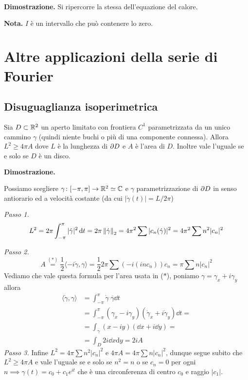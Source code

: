 \textbf{Dimostrazione.}
Si ripercorre la stessa dell'equazione del calore.

\textbf{Nota.} $I$ è un intervallo che può contenere lo zero.


\section{Altre applicazioni della serie di Fourier}

\subsection{Disuguaglianza isoperimetrica}

Sia $D \subset \mathbb R^2$ un aperto limitato con frontiera $C^1$ parametrizzata da un unico cammino $\gamma$ (quindi niente buchi o più di una componente connessa). Allora $L^2 \geq 4 \pi A$ dove $L$ è la lunghezza di $\partial D$ e $A$ è l'area di $D$. Inoltre vale l'uguale se e solo se $D$ è un disco.

\textbf{Dimostrazione.}

Possiamo scegliere $\gamma \colon [-\pi, \pi] \to \mathbb R^2 \simeq \mathbb C$ e $\gamma$ parametrizzazione di $\partial D$ in senso antiorario ed a velocità costante (da cui $|\dot\gamma(t)| = L / 2\pi$)

\textit{Passo 1.}
$$
L^2 = 2\pi \int_{-\pi}^\pi |\dot \gamma|^2 \,\mathrm{d} t = 2\pi \left\lVert \dot \gamma \right\rVert_2 = 4 \pi^2 \sum |c_n(\dot \gamma)|^2 = 4 \pi^2 \sum n^2 |c_n|^2
$$

\textit{Passo 2.}
$$
A \overset{(*)}{=} \frac{1}{2}\langle -i\dot\gamma, \gamma \rangle = \frac{1}{2} 2\pi \sum (-i (inc_n))c_n = \pi \sum n |c_n|^2
$$
Vediamo che vale questa formula per l'area usata in ($*$), poniamo $\gamma = \gamma_x + i \gamma_y$ allora
$$
\begin{aligned}
	\langle \dot\gamma, \gamma \rangle 
	&= \int_{-\pi}^\pi \dot\gamma \; \overline\gamma \dd t \\
	&= \int_{-\pi}^\pi (\gamma_x - i \gamma_y) (\dot\gamma_x + i \dot\gamma_y) \dd t = \\
	&= \int_\gamma (x - iy) (\dd x + i \dd y) = \\
	&= \int_D 2i \dd x \mathrm d y = 2i A
\end{aligned}
$$
\textit{Passo 3.}
Infine $L^2 = 4 \pi \sum n^2 |c_n|^2$ e $4\pi A = 4\pi \sum n |c_n|^2$, dunque segue subito che $L^2 \geq 4 \pi A$ e vale l'uguale se e solo se $n^2 = n$ o se $c_n = 0$ per ogni $n \implies \gamma(t) = c_0 + c_1 e^{it}$ che è una circonferenza di centro $c_0$ e raggio $|c_1|$.




